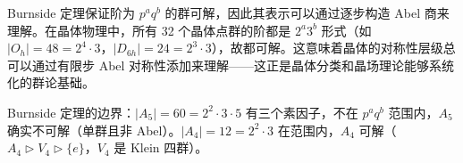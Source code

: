 \begin{note}
Burnside 定理保证阶为 $p^aq^b$ 的群可解，因此其表示可以通过逐步构造 Abel 商来理解。在晶体物理中，所有 32 个晶体点群的阶都是 $2^a3^b$ 形式（如 $|O_h|=48=2^4\cdot3$，$|D_{6h}|=24=2^3\cdot3$），故都可解。这意味着晶体的对称性层级总可以通过有限步 Abel 对称性添加来理解——这正是晶体分类和晶场理论能够系统化的群论基础。

Burnside 定理的边界：$|A_5|=60=2^2\cdot3\cdot5$ 有三个素因子，不在 $p^aq^b$ 范围内，$A_5$ 确实不可解（单群且非 Abel）。$|A_4|=12=2^2\cdot3$ 在范围内，$A_4$ 可解（$A_4\rhd V_4\rhd\{e\}$，$V_4$ 是 Klein 四群）。
\end{note}


